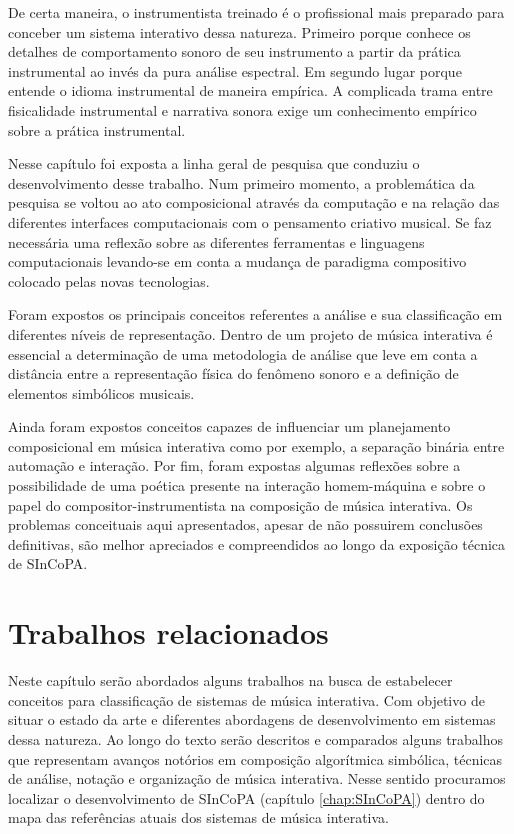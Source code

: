 \documentclass{ppgmus}
\begin{document}
De certa maneira, o instrumentista treinado é o profissional
mais preparado para conceber um sistema interativo dessa natureza.
Primeiro porque conhece os detalhes de comportamento sonoro de seu
instrumento a partir da prática instrumental ao invés da pura análise
espectral. Em segundo lugar porque entende o idioma instrumental
de maneira empírica. A complicada trama entre fisicalidade instrumental
e narrativa sonora exige um conhecimento empírico sobre a prática
instrumental.



Nesse capítulo foi exposta a linha geral de pesquisa que conduziu
o desenvolvimento desse trabalho.
Num primeiro momento, a problemática da pesquisa se voltou ao ato composicional
através da computação e na relação das diferentes interfaces computacionais
com o pensamento criativo musical. Se faz necessária uma reflexão sobre
as diferentes ferramentas e linguagens computacionais levando-se em conta
a mudança de paradigma compositivo colocado pelas novas tecnologias.

Foram expostos os principais conceitos referentes a análise e sua
classificação em diferentes níveis de representação.
Dentro de um projeto de música interativa é essencial a determinação de uma
metodologia de análise que leve em conta a distância entre a representação
física do fenômeno sonoro e a definição de elementos simbólicos musicais.

Ainda foram expostos conceitos capazes de influenciar um planejamento
composicional em música interativa como por exemplo, a separação binária entre
automação e interação. Por fim, foram expostas algumas reflexões sobre a
possibilidade de uma poética presente na interação homem-máquina e sobre
o papel do compositor-instrumentista na composição de música interativa.
Os problemas conceituais aqui apresentados, apesar de não possuirem
conclusões definitivas, são melhor apreciados e compreendidos ao longo
da exposição técnica de SInCoPA.



\chapter{Trabalhos relacionados}
\label{sec:rev}


Neste capítulo serão abordados alguns trabalhos na busca
de estabelecer conceitos para classificação de sistemas
de música interativa. Com objetivo de situar
o estado da arte e diferentes abordagens de desenvolvimento em sistemas dessa
natureza. Ao longo do texto serão descritos e comparados alguns trabalhos
que representam avanços notórios em composição algorítmica simbólica, 
técnicas de análise, notação e organização de música interativa.
Nesse sentido procuramos localizar o desenvolvimento de SInCoPA (capítulo \ref{chap:SInCoPA})
dentro do mapa das referências atuais dos sistemas de música interativa.
\end{document}
